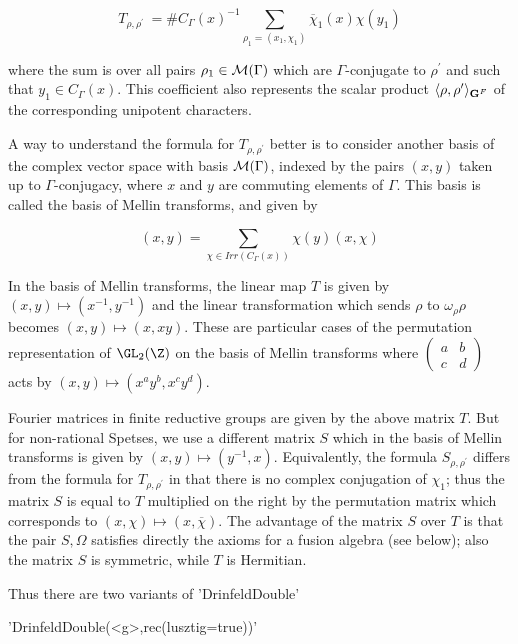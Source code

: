 $$T_{\rho,\rho^\prime}\:=\#C_\Gamma(x)^{-1}
\sum_{\rho_1=(x_1,\chi_1)}\overline\chi_1(x)\chi(y_1)$$

where  the  sum  is  over  all  pairs $\rho_1\in{\cal M}(\Gamma)$ which are
$\Gamma$-conjugate  to  $\rho^\prime$  and  such that $y_1\in C_\Gamma(x)$.
This coefficient also represents the scalar product
$\langle\rho,\rho^\prime\rangle_{{\bf G}^F}$  of  the  corresponding  unipotent
characters.

A  way to  understand the  formula for  $T_{\rho,\rho^\prime}$ better is to
consider  another  basis  of  the  complex  vector  space with basis ${\cal
M}(\Gamma)$,  indexed by the pairs  $(x,y)$ taken up to $\Gamma$-conjugacy,
where  $x$ and $y$ are commuting elements of $\Gamma$. This basis is called
the basis of Mellin transforms, and given by\:

$$(x,y)=\sum_{\chi\in Irr(C_\Gamma(x))}\chi(y)(x,\chi)$$

In  the  basis  of  Mellin  transforms,  the  linear  map  $T$  is given by
$(x,y)\mapsto(x^{-1},y^{-1})$  and  the  linear  transformation which sends
$\rho$   to  $\omega_\rho\rho$  becomes   $(x,y)\mapsto(x,xy)$.  These  are
particular  cases of the  permutation representation of  $\GL_2(\Z)$ on the
basis of Mellin transforms where
$\left(\begin{array}{cc}a&b\\c&d\end{array}\right)$
acts by $(x,y)\mapsto(x^ay^b,x^cy^d)$.

Fourier  matrices in finite reductive groups  are given by the above matrix
$T$.  But for non-rational Spetses, we use  a different matrix $S$ which in
the  basis  of  Mellin  transforms  is  given  by $(x,y)\mapsto(y^{-1},x)$.
Equivalently,  the formula $S_{\rho,\rho^\prime}$  differs from the formula
for  $T_{\rho,\rho^\prime}$  in  that  there  is  no complex conjugation of
$\chi_1$;  thus the matrix $S$  is equal to $T$  multiplied on the right by
the permutation matrix which corresponds to
$(x,\chi)\mapsto(x,\overline\chi)$.  The advantage  of the  matrix $S$ over
$T$  is that the pair $S,\Omega$ satisfies directly the axioms for a fusion
algebra  (see  below);  also  the  matrix  $S$  is  symmetric, while $T$ is
Hermitian.

Thus there are two variants of 'DrinfeldDouble'\:

'DrinfeldDouble(<g>,rec(lusztig\:=true))'

